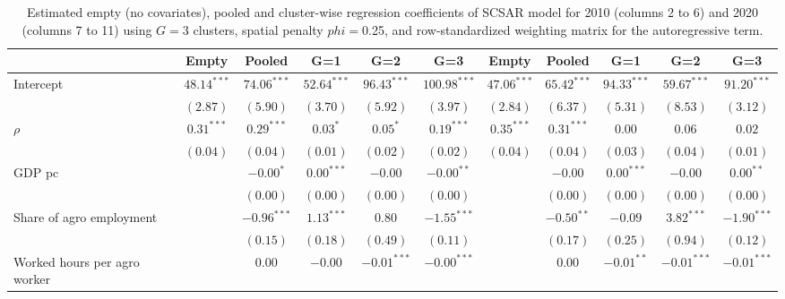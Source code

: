 
\begin{table}
\caption{Estimated empty (no covariates), pooled and cluster-wise regression coefficients of SCSAR model for 2010 (columns 2 to 6) and 2020 (columns 7 to 11) using $G=$3 clusters, spatial penalty $phi=$0.25, and row-standardized weighting matrix for the autoregressive term.}
\begin{center}
\begin{tabular}{l c c c c c c c c c c}
\hline
 & Empty & Pooled & G=1 & G=2 & G=3 & Empty & Pooled & G=1 & G=2 & G=3 \\
\hline
Intercept                         & $48.14^{***}$ & $74.06^{***}$ & $52.64^{***}$ & $96.43^{***}$ & $100.98^{***}$ & $47.06^{***}$ & $65.42^{***}$ & $94.33^{***}$ & $59.67^{***}$ & $91.20^{***}$ \\
                                  & $(2.87)$      & $(5.90)$      & $(3.70)$      & $(5.92)$      & $(3.97)$       & $(2.84)$      & $(6.37)$      & $(5.31)$      & $(8.53)$      & $(3.12)$      \\
$\rho$                            & $0.31^{***}$  & $0.29^{***}$  & $0.03^{*}$    & $0.05^{*}$    & $0.19^{***}$   & $0.35^{***}$  & $0.31^{***}$  & $0.00$        & $0.06$        & $0.02$        \\
                                  & $(0.04)$      & $(0.04)$      & $(0.01)$      & $(0.02)$      & $(0.02)$       & $(0.04)$      & $(0.04)$      & $(0.03)$      & $(0.04)$      & $(0.01)$      \\
GDP pc                            &               & $-0.00^{*}$   & $0.00^{***}$  & $-0.00$       & $-0.00^{**}$   &               & $-0.00$       & $0.00^{***}$  & $-0.00$       & $0.00^{**}$   \\
                                  &               & $(0.00)$      & $(0.00)$      & $(0.00)$      & $(0.00)$       &               & $(0.00)$      & $(0.00)$      & $(0.00)$      & $(0.00)$      \\
Share of agro employment          &               & $-0.96^{***}$ & $1.13^{***}$  & $0.80$        & $-1.55^{***}$  &               & $-0.50^{**}$  & $-0.09$       & $3.82^{***}$  & $-1.90^{***}$ \\
                                  &               & $(0.15)$      & $(0.18)$      & $(0.49)$      & $(0.11)$       &               & $(0.17)$      & $(0.25)$      & $(0.94)$      & $(0.12)$      \\
Worked hours per agro worker      &               & $0.00$        & $-0.00$       & $-0.01^{***}$ & $-0.00^{***}$  &               & $0.00$        & $-0.01^{**}$  & $-0.01^{***}$ & $-0.01^{***}$ \\

\end{tabular}
\end{center}
\end{table}
